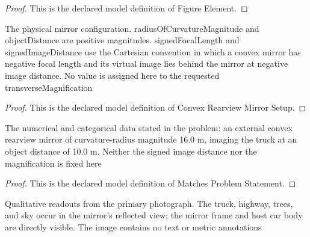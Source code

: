 \begin{proof}
  This is the declared model definition of Figure Element.
\end{proof}
\begin{definition}
  \label{def:physics:phyx-mini-0139:phyxminiproblems-problemphyxmini0139-convexrearviewmirrorsetup}
  The physical mirror configuration. radiusOfCurvatureMagnitude and objectDistance are positive magnitudes. signedFocalLength and signedImageDistance use the Cartesian convention in which a convex mirror has negative focal length and its virtual image lies behind the mirror at negative image distance. No value is assigned here to the requested transverseMagnification
\end{definition}
\begin{proof}
  This is the declared model definition of Convex Rearview Mirror Setup.
\end{proof}
\begin{definition}
  \label{def:physics:phyx-mini-0139:phyxminiproblems-problemphyxmini0139-matchesproblemstatement}
  The numerical and categorical data stated in the problem: an external convex rearview mirror of curvature-radius magnitude 16.0 m, imaging the truck at an object distance of 10.0 m. Neither the signed image distance nor the magnification is fixed here
\end{definition}
\begin{proof}
  This is the declared model definition of Matches Problem Statement.
\end{proof}
\begin{definition}
  \label{def:physics:phyx-mini-0139:phyxminiproblems-problemphyxmini0139-matchesprimaryfigure}
  Qualitative readouts from the primary photograph. The truck, highway, trees, and sky occur in the mirror's reflected view; the mirror frame and host car body are directly visible. The image contains no text or metric annotations
\end{definition}
